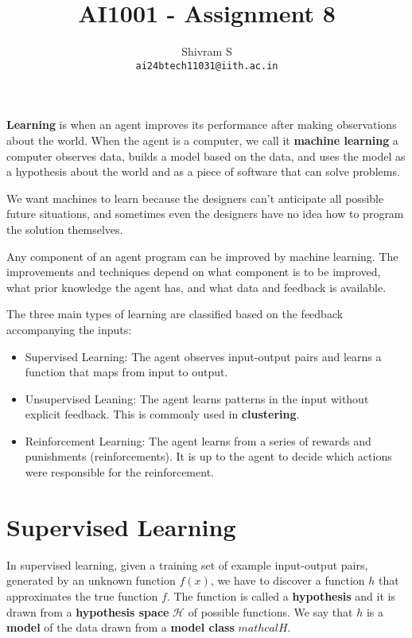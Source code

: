 \documentclass{article}
\author{Shivram S \\ \texttt{ai24btech11031@iith.ac.in}}
\title{AI1001 - Assignment 8}
\begin{document}
\maketitle

\textbf{Learning} is when an agent improves its performance after making observations 
about the world. When the agent is a computer, we call it \textbf{machine learning}
a computer observes data, builds a model based on the data, and uses the model as 
a hypothesis about the world and as a piece of software that can solve problems.

We want machines to learn because the designers can't anticipate all possible future
situations, and sometimes even the designers have no idea how to program the solution
themselves. 

Any component of an agent program can be improved by machine learning. The improvements
and techniques depend on what component is to be improved, what prior knowledge the
agent has, and what data and feedback is available.

The three main types of learning are classified based on the feedback
accompanying the inputs:
\begin{itemize}
    \item Supervised Learning: The agent observes input-output pairs and learns a
        function that maps from input to output.
    \item Unsupervised Leaning: The agent learns patterns in the input without explicit
        feedback. This is commonly used in \textbf{clustering}.
    \item Reinforcement Learning: The agent learns from a series of rewards and
        punishments (reinforcements). It is up to the agent to decide which actions
        were responsible for the reinforcement.
\end{itemize}

\section{Supervised Learning}

In supervised learning, given a training set of example input-output pairs,
generated by an unknown function $f(x)$, we have to discover a function $h$ that
approximates the true function $f$. The function is called a \textbf{hypothesis} and
it is drawn from a \textbf{hypothesis space} $\mathcal H$ of possible functions.
We say that $h$ is a \textbf{model} of the data drawn from a \textbf{model class} $mathcal H$.
\end{document}

